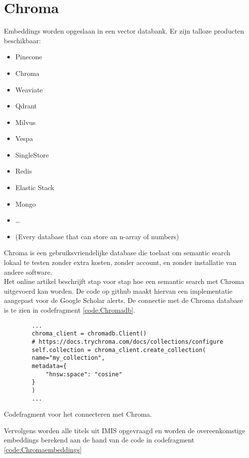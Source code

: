 \section{Chroma}
Embeddings worden opgeslaan in een vector databank. Er zijn talloze producten beschikbaar:
\begin{itemize}
    \item Pinecone
    \item Chroma
    \item Weaviate
    \item Qdrant
    \item Milvus
    \item Vespa
    \item SingleStore
    \item Redis
    \item Elastic Stack
    \item Mongo
    \item …
    \item (Every database that can store an n-array of numbers)
\end{itemize}
Chroma \autocite{Chroma2025} is een gebruiksvriendelijke database die toelaat om semantic search lokaal te testen zonder extra kosten, zonder account, en zonder installatie van andere software.\\
Het online artikel \textcite{Usechroma2025} beschrijft stap voor stap hoe een semantic search met Chroma uitgevoerd kan worden. 
De code op github \textcite{Depaepechroma2025} maakt hiervan een implementatie aangepast voor de Google Scholar alerts.
De connectie met de Chroma database is te zien in codefragment \ref{code:Chromadb}.
\begin{listing}
    \begin{verbatim}
        ...
        chroma_client = chromadb.Client()
        # https://docs.trychroma.com/docs/collections/configure
        self.collection = chroma_client.create_collection(
        name="my_collection",
        metadata={
            "hnsw:space": "cosine"
        }
        )
        ...
    \end{verbatim}
    \caption[Chroma codefragment]{Codefragment voor het connecteren met Chroma.}
    \label{code:Chromadb}
\end{listing}
Vervolgens worden alle titels uit IMIS opgevraagd en worden de overeenkomstige embeddings berekend aan de hand van de code in codefragment \ref{code:Chromaembeddings}
